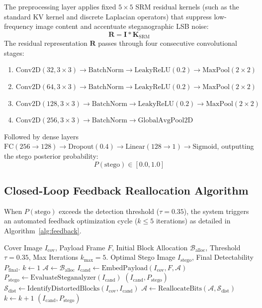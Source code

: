 \documentclass[conference]{IEEEtran}
\begin{document}
The preprocessing layer applies fixed $5 \times 5$ SRM residual kernels (such as the standard KV kernel and discrete Laplacian operators) that suppress low-frequency image content and accentuate steganographic LSB noise:
\begin{equation}
    \mathbf{R} = \mathbf{I} * \mathbf{K}_{\text{SRM}}
\end{equation}
The residual representation $\mathbf{R}$ passes through four consecutive convolutional stages:
\begin{enumerate}
    \item $\text{Conv2D}(32, 3 \times 3) \to \text{BatchNorm} \to \text{LeakyReLU}(0.2) \to \text{MaxPool}(2 \times 2)$
    \item $\text{Conv2D}(64, 3 \times 3) \to \text{BatchNorm} \to \text{LeakyReLU}(0.2) \to \text{MaxPool}(2 \times 2)$
    \item $\text{Conv2D}(128, 3 \times 3) \to \text{BatchNorm} \to \text{LeakyReLU}(0.2) \to \text{MaxPool}(2 \times 2)$
    \item $\text{Conv2D}(256, 3 \times 3) \to \text{BatchNorm} \to \text{GlobalAvgPool2D}$
\end{enumerate}
Followed by dense layers $\text{FC}(256 \to 128) \to \text{Dropout}(0.4) \to \text{Linear}(128 \to 1) \to \text{Sigmoid}$, outputting the stego posterior probability:
\begin{equation}
    P(\text{stego}) \in [0.0, 1.0]
\end{equation}

\subsection{Closed-Loop Feedback Reallocation Algorithm}
When $P(\text{stego})$ exceeds the detection threshold ($\tau = 0.35$), the system triggers an automated feedback optimization cycle ($k \le 5$ iterations) as detailed in Algorithm~\ref{alg:feedback}.

\begin{algorithm}[htbp]
\caption{Closed-Loop Adversarial Feedback Optimization}
\label{alg:feedback}
\begin{algorithmic}[1]
\REQUIRE Cover Image $I_{\text{cov}}$, Payload Frame $F$, Initial Block Allocation $\mathcal{B}_{\text{alloc}}$, Threshold $\tau = 0.35$, Max Iterations $k_{\max} = 5$.
\ENSURE Optimal Stego Image $I_{\text{stego}}$, Final Detectability $P_{\text{final}}$.
\STATE $k \leftarrow 1$
\STATE $\mathcal{A} \leftarrow \mathcal{B}_{\text{alloc}}$
\REPEAT
    \STATE $I_{\text{cand}} \leftarrow \text{EmbedPayload}(I_{\text{cov}}, F, \mathcal{A})$
    \STATE $P_{\text{stego}} \leftarrow \text{EvaluateSteganalyzer}(I_{\text{cand}})$
        \RETURN $(I_{\text{cand}}, P_{\text{stego}})$ 
    \ENDIF
    \STATE $\mathcal{S}_{\text{dist}} \leftarrow \text{IdentifyDistortedBlocks}(I_{\text{cov}}, I_{\text{cand}})$
    \STATE $\mathcal{A} \leftarrow \text{ReallocateBits}(\mathcal{A}, \mathcal{S}_{\text{dist}})$ 
    \STATE $k \leftarrow k + 1$
\RETURN $(I_{\text{cand}}, P_{\text{stego}})$
\end{algorithmic}
\end{algorithm}
\end{document}
